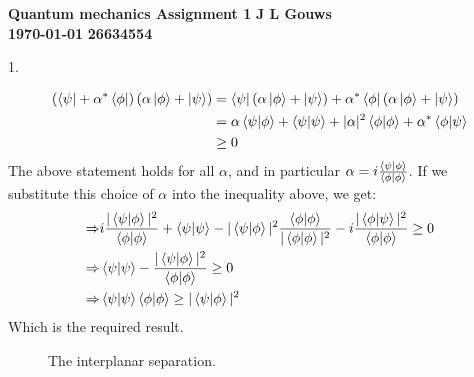 \documentclass[a4paper,12pt]{article}
\newcommand\block[1]{\hspace*{#1}}
\begin{document}
\selectfont
{\Large \textbf{Quantum mechanics Assignment 1}} \hfill {\Large \textbf{J L Gouws}}\\
\block{1.0cm} {\large \textbf{\today}} \hfill {\large \textbf{26634554}}\\
\thispagestyle{empty}

1.
\begin{minipage}[t]{0.9\textwidth}
  \begin{align*}
    \left(\bra{\psi} + \alpha^* \bra{\phi}\right)\left(\alpha \ket{\phi} + \ket{\psi}\right) &= \bra{\psi}\left(\alpha \ket{\phi} + \ket{\psi}\right) + \alpha^* \bra{\phi}\left(\alpha \ket{\phi} + \ket{\psi}\right)\\
                                                                                             &= \alpha \braket{\psi|\phi} + \braket{\psi|\psi} + |\alpha|^2 \braket{\phi | \phi}+ \alpha^*\braket{\phi|\psi}\\
                                                                                             & \geq 0\\
  \end{align*}
  The above statement holds for all $\alpha$, and in particular $\alpha = i\frac{\braket{\psi|\phi}}{\braket{\phi | \phi}}$.
  If we substitute this choice of $\alpha$ into the inequality above, we get:
  \begin{align*}
    \Rightarrow & i \frac{|\braket{\psi|\phi}|^2}{\braket{\phi|\phi}} + \braket{\psi|\psi} - |\braket{\psi|\phi}|^2\frac{\braket{\phi | \phi}}{|\braket{\phi | \phi}|^2} - i \frac{|\braket{\phi|\psi}|^2}{\braket{\phi|\phi}} \geq 0\\
    \Rightarrow & \braket{\psi|\psi} - \frac{|\braket{\psi|\phi}|^2}{\braket{\phi | \phi}} \geq 0\\
    \Rightarrow & \braket{\psi|\psi} \braket{\phi | \phi} \geq |\braket{\psi|\phi}|^2\\
  \end{align*}
  Which is the required result. 
\end{minipage}

\iffalse
\begin{figure}
  \centering
  \caption{The interplanar separation.}
  \label{fig:planeSep}
\end{figure}
\end{document}
